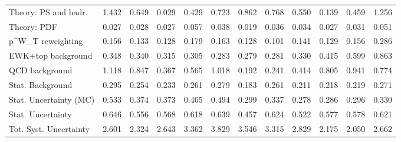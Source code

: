 \begin{tabular}{l|p{0.6cm}p{0.6cm}p{0.6cm}p{0.6cm}p{0.6cm}p{0.6cm}p{0.6cm}p{0.6cm}p{0.6cm}p{0.6cm}p{0.6cm}}
Theory: PS and hadr.                     & 1.432 & 0.649 & 0.029 & 0.429 & 0.723 & 0.862 & 0.768 & 0.550 & 0.139 & 0.459 & 1.256 \\
Theory: PDF                              & 0.027 & 0.028 & 0.027 & 0.057 & 0.038 & 0.019 & 0.036 & 0.034 & 0.027 & 0.031 & 0.051 \\
p^{W}_{T} reweighting                    & 0.156 & 0.133 & 0.128 & 0.179 & 0.163 & 0.128 & 0.101 & 0.141 & 0.129 & 0.156 & 0.286 \\
EWK+top background                       & 0.348 & 0.340 & 0.315 & 0.305 & 0.283 & 0.279 & 0.281 & 0.330 & 0.415 & 0.599 & 0.863 \\
QCD background                           & 1.118 & 0.847 & 0.367 & 0.565 & 1.018 & 0.192 & 0.241 & 0.414 & 0.805 & 0.941 & 0.774 \\
Stat. Background                         & 0.295 & 0.254 & 0.233 & 0.261 & 0.279 & 0.183 & 0.261 & 0.211 & 0.218 & 0.219 & 0.271 \\
Stat. Uncertainty (MC)                   & 0.533 & 0.374 & 0.373 & 0.465 & 0.494 & 0.299 & 0.337 & 0.278 & 0.286 & 0.296 & 0.330 \\
\hline
Stat. Uncertainty                        & 0.646 & 0.556 & 0.568 & 0.618 & 0.639 & 0.457 & 0.624 & 0.522 & 0.577 & 0.578 & 0.621 \\
\hline
Tot. Syst. Uncertainty                   & 2.601 & 2.324 & 2.643 & 3.362 & 3.829 & 3.546 & 3.315 & 2.829 & 2.175 & 2.050 & 2.662 \\
\hline
\end{tabular}
